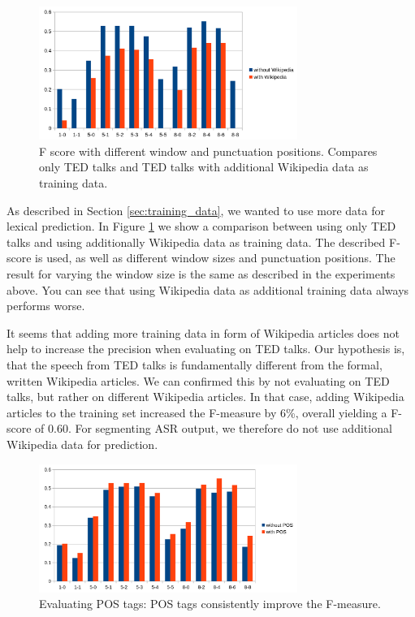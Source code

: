\begin{figure}[ht]
    \centering
    \includegraphics[width=0.75\textwidth]{img/window_wiki_eval.png}
    \caption{F score with different window and punctuation positions. Compares only TED talks and TED talks with additional Wikipedia data as training data.}
    \label{fig:window_wiki_eval}
\end{figure}

As described in Section \ref{sec:training_data}, we wanted to use more data for lexical prediction.
In Figure \ref{fig:window_wiki_eval} we show a comparison between using only TED talks and using additionally Wikipedia data as training data.
The described F-score is used, as well as different window sizes and punctuation positions.
The result for varying the window size is the same as described in the experiments above.
You can see that using Wikipedia data as additional training data always performs worse.

It seems that adding more training data in form of Wikipedia articles does not help to increase the precision when evaluating on TED talks.
Our hypothesis is, that the speech from TED talks is fundamentally different from the formal, written Wikipedia articles.
We can confirmed this by not evaluating on TED talks, but rather on different Wikipedia articles.
In that case, adding Wikipedia articles to the training set increased the F-measure by 6\%, overall yielding a F-score of 0.60.
For segmenting ASR output, we therefore do not use additional Wikipedia data for prediction.

\begin{figure}[ht]
    \centering
    \includegraphics[width=0.75\textwidth]{img/window_pos_eval.png}
    \caption{Evaluating POS tags: POS tags consistently improve the F-measure.}
    \label{fig:window_pos_eval}
\end{figure}

